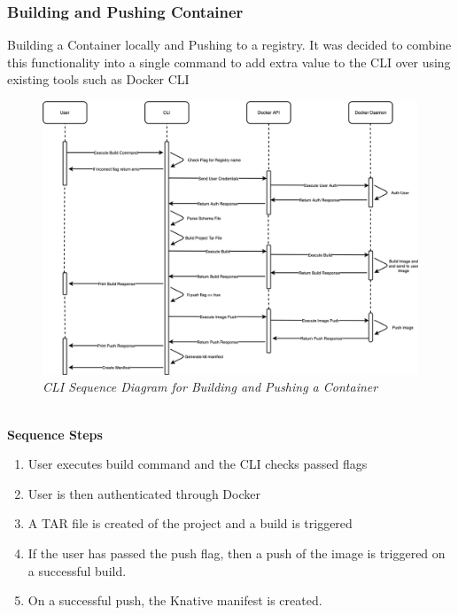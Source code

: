 \subsubsection{Building and Pushing Container}
Building a Container locally and Pushing to a registry. It was decided to combine this functionality into a single command to add extra value to the CLI over using existing tools such as Docker CLI
\begin{figure}[!hb]
\centering
\includegraphics*[width=1\textwidth]{images/build-use-case.png}
\caption{\em CLI Sequence Diagram for Building and Pushing a Container}
\label{img:cli_seq2}
\end{figure}
\\\textbf{Sequence Steps}
\begin{enumerate}
  \item User executes build command and the CLI checks passed flags
  \item User is then authenticated through Docker
  \item A TAR file is created of the project and a build is triggered
  \item If the user has passed the push flag, then a push of the image is triggered on a successful build. 
  \item On a successful push, the Knative manifest is created.
\end{enumerate}
\clearpage
